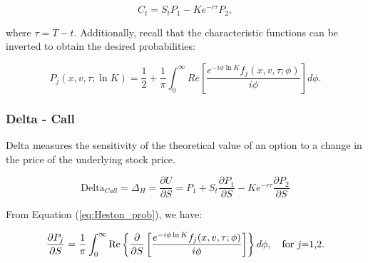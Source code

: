 \documentclass[a4paper]{article}
\begin{document}
\begin{equation}
	C_t = S_tP_1 - Ke^{-r\tau}P_2,
	\label{eq:Heston_C}
\end{equation}

where $\tau=T-t$. Additionally, recall that the characteristic functions can be inverted to obtain the desired probabilities:

\begin{equation}
	P_j(x,v,\tau;\ln K) = \frac{1}{2} + \frac{1}{\pi} \int_0^\infty Re \left[\frac{e^{-i\phi \ln K}f_j(x,v,\tau;\phi)}{i\phi} \right] d\phi. 
	\label{eq:Heston_prob}
\end{equation}



\newpage



\subsubsection*{Delta - Call}

Delta measures the sensitivity of the theoretical value of an option to a change in the price of the underlying stock price.

\begin{equation}
	\mbox{Delta}_{Call} = \Delta_H = \frac{\partial U}{\partial S} = P_1 + S_t\frac{\partial P_1}{\partial S} - Ke^{-r\tau}\frac{\partial P_2}{\partial S} 
	\label{eq:Heston_Delta_Start}
\end{equation}

From Equation (\ref{eq:Heston_prob}), we have:

\begin{equation*}
	\frac{\partial P_j}{\partial S} = \frac{1}{\pi}\int_0^{\infty}\mbox{Re} \left\{\frac{\partial}{\partial S} \left[\frac{e^{-i\phi \ln K}f_j(x,v,\tau;\phi)}{i\phi}\right] \right\} d\phi, \quad \text{for \textit{j}=1,2.} 
\end{equation*}
\end{document}

